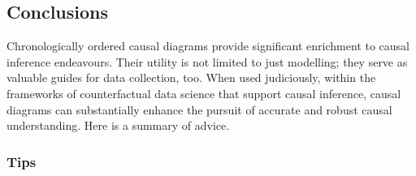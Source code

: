 \documentclass[
  singlecolumn,
  9pt]{article}
\begin{document}
\subsection{Conclusions}\label{conclusions}

Chronologically ordered causal diagrams provide significant enrichment
to causal inference endeavours. Their utility is not limited to just
modelling; they serve as valuable guides for data collection, too. When
used judiciously, within the frameworks of counterfactual data science
that support causal inference, causal diagrams can substantially enhance
the pursuit of accurate and robust causal understanding. Here is a
summary of advice.

\subsubsection{Tips}\label{tips}
\end{document}
